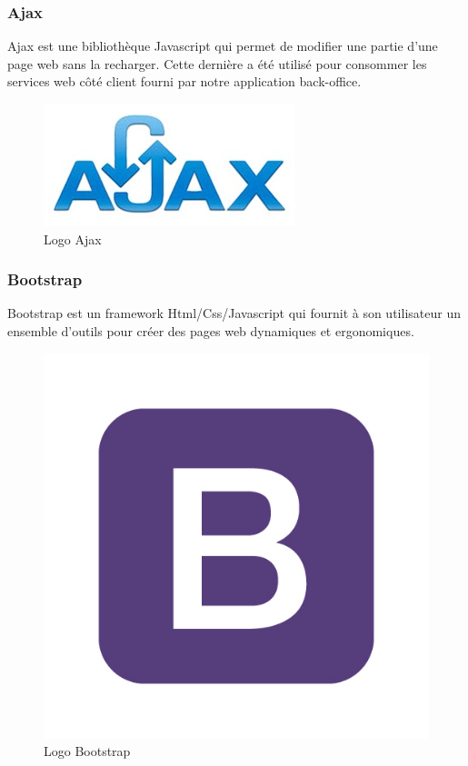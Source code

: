 \subsubsection{Ajax}
\noindent\begin{minipage}{0.69\textwidth}
Ajax est une bibliothèque Javascript qui permet de modifier une partie d'une page web sans la recharger. Cette dernière a été utilisé pour consommer les services web côté client fourni par notre application back-office.
\end{minipage}
\begin{minipage}{0.3\textwidth}
\begin{figure}[H]
  \centering
  \includegraphics[scale=0.4]{figures/logo/ajax.jpg}
  \caption{Logo Ajax}
  \label{code48}
\end{figure}
\end{minipage}
\subsubsection{Bootstrap}
\noindent\begin{minipage}{0.69\textwidth}
Bootstrap est un framework Html/Css/Javascript qui fournit à son utilisateur un ensemble d'outils pour créer des pages web dynamiques et ergonomiques.
\end{minipage}
\begin{minipage}{0.3\textwidth}
\begin{figure}[H]
  \centering
  \includegraphics[scale=0.15]{figures/logo/bootstrap.jpg}
  \caption{Logo Bootstrap}
  \label{code49}
\end{figure}
\end{minipage}
